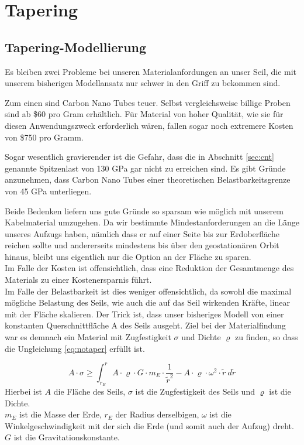\documentclass[a4paper, 10pt]{report}
\begin{document}
\section{Tapering}
\subsection{Tapering-Modellierung}
Es bleiben zwei Probleme bei unseren Materialanfordungen an unser Seil, die mit unserem bisherigen Modellansatz nur schwer in den Griff zu bekommen sind.

Zum einen sind Carbon Nano Tubes teuer. Selbst vergleichsweise billige Proben sind ab \$60 pro Gram erhältlich. Für Material von hoher Qualität, wie sie für diesen Anwendungszweck erforderlich wären, fallen sogar noch extremere Kosten von \$750 pro Gramm\cite{baughman2002carbon}.

Sogar wesentlich gravierender ist die Gefahr, dass die in Abschnitt \ref{sec:cnt} genannte Spitzenlast von 130 GPa gar nicht zu erreichen sind. Es gibt Gründe anzunehmen, dass Carbon Nano Tubes einer theoretischen Belastbarkeitsgrenze von 45 GPa unterliegen\cite{pugno2007space}.

Beide Bedenken liefern uns gute Gründe so sparsam wie möglich mit unserem Kabelmaterial umzugehen. Da wir bestimmte Mindestanforderungen an die Länge unseres Aufzugs haben, nämlich dass er auf einer Seite bis zur Erdoberfläche reichen sollte und andererseits mindestens bis über den geostationären Orbit hinaus, bleibt uns eigentlich nur die Option an der Fläche zu sparen.\\
Im Falle der Kosten ist offensichtlich, dass eine Reduktion der Gesamtmenge des Materials zu einer Kostenersparnis führt.\\
Im Falle der Belastbarkeit ist dies weniger offensichtlich, da sowohl die maximal mögliche Belastung des Seils, wie auch die auf das Seil wirkenden Kräfte, linear mit der Fläche skalieren. Der Trick ist, dass unser bisheriges Modell von einer konstanten Querschnittfläche A des Seils ausgeht. Ziel bei der Materialfindung war es demnach ein Material mit Zugfestigkeit $\sigma$ und Dichte $\varrho$ zu finden, so dass die Ungleichung \ref{eq:notaper} erfüllt ist.

\begin{equation}
A \cdot \sigma \geq \int_{r_E}^{r} A \cdot \varrho \cdot G \cdot m_E \cdot \frac{1}{\tilde{r}^2} - A \cdot \varrho \cdot \omega^2 \cdot \tilde{r}\ d\tilde{r}
\label{eq:notaper}
\end{equation}
Hierbei ist $A$ die Fläche des Seils, $\sigma$ ist die Zugfestigkeit des Seils und $\varrho$ ist die Dichte.\\
$m_E$ ist die Masse der Erde, $r_E$ der Radius derselbigen, $\omega$ ist die Winkelgeschwindigkeit mit der sich die Erde (und somit auch der Aufzug) dreht.\\
$G$ ist die Gravitationskonstante.
\end{document}
